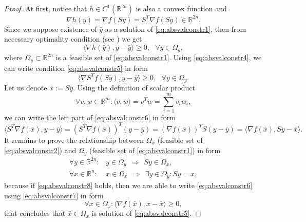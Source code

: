 \begin{proof}
At first, notice that $h \in C^1(\mathbb{R}^{2n})$ is also a convex function and
\begin{equation}
  \label{eq:absvalconstr4}
  \nabla h(y) = \nabla f(Sy) = S^T \nabla f(Sy) \in \mathbb{R}^{2n}.
\end{equation}
Since we suppose existence of $\bar{y}$ as a solution of \eqref{eq:absvalconstr1}, then from necessary optimality condition (see )
we get
\begin{equation}
 \label{eq:absvalconstr5}
  \langle \nabla h(\bar{y}), y - \bar{y} \rangle \geq 0, ~~~ \forall y \in \Omega_y,
\end{equation}
where $\Omega_y \subset \mathbb{R}^{2n}$ is a feasible set of \eqref{eq:absvalconstr1}. Using \eqref{eq:absvalconstr4}, we can write condition \eqref{eq:absvalconstr5}
in form
\begin{equation}
 \label{eq:absvalconstr6}
  \langle \nabla S^T f(S \bar{y}), y - \bar{y} \rangle \geq 0, ~~~ \forall y \in \Omega_y.
\end{equation}
Let us denote $\bar{x} := S \bar{y}$. Using the definition of scalar product
\begin{displaymath}
 \forall v,w \in \mathbb{R}^m: \langle v,w \rangle = v^T w = \sum\limits_{i = 1}^{m} v_i w_i,
\end{displaymath}
we can write the left part of \eqref{eq:absvalconstr6} in form
\begin{equation}
 \label{eq:absvalconstr7}
 \langle S^T \nabla f(\bar{x}), y - \bar{y} \rangle
 = \left( S^T \nabla f(\bar{x}) \right)^T \left( y - \bar{y} \right)
 = \left( \nabla f(\bar{x}) \right)^T S \left( y - \bar{y} \right)
 = \langle \nabla f(\bar{x}), Sy - \bar{x} \rangle.
\end{equation}
It remains to prove the relationship between $\Omega_x$ (feasible set of \eqref{eq:absvalconstr2}) and $\Omega_y$ (feasible set of \eqref{eq:absvalconstr1}) in form
\begin{equation}
 \label{eq:absvalconstr8}
 \begin{array}{ll}
  \forall y \in \mathbb{R}^{2n}: & y \in \Omega_y ~~ \Rightarrow ~~ Sy \in \Omega_x, \\
  \forall x \in \mathbb{R}^{n}: & x \in \Omega_x ~~ \Rightarrow ~~ \exists y \in \Omega_y: Sy = x, 
 \end{array}
\end{equation}
because if \eqref{eq:absvalconstr8} holds, then we are able to write \eqref{eq:absvalconstr6} using \eqref{eq:absvalconstr7} in form
\begin{displaymath}
 \forall x \in \Omega_x: \langle \nabla f(\bar{x}), x - \bar{x} \rangle \geq 0,
\end{displaymath}
that concludes that $\bar{x} \in \Omega_x$ is solution of \eqref{eq:absvalconstr5}.\newline


\end{proof}
